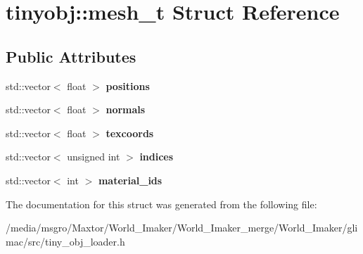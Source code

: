 \hypertarget{structtinyobj_1_1mesh__t}{}\section{tinyobj\+:\+:mesh\+\_\+t Struct Reference}
\label{structtinyobj_1_1mesh__t}
\subsection*{Public Attributes}
\begin{DoxyCompactItemize}
\item 
\mbox{\label{structtinyobj_1_1mesh__t_a3014a27913256384aa283345b69ff2ec}} 
std\+::vector$<$ float $>$ {\bfseries positions}
\item 
\mbox{\label{structtinyobj_1_1mesh__t_a28c2f7eb3114e6ed82a5b7326a4e7a1c}} 
std\+::vector$<$ float $>$ {\bfseries normals}
\item 
\mbox{\label{structtinyobj_1_1mesh__t_a0fc485afc76bcd7e147b22285d7d6575}} 
std\+::vector$<$ float $>$ {\bfseries texcoords}
\item 
\mbox{\label{structtinyobj_1_1mesh__t_aa0a07f40559a650e6917c506d78e298a}} 
std\+::vector$<$ unsigned int $>$ {\bfseries indices}
\item 
\mbox{\label{structtinyobj_1_1mesh__t_a57b2f12dfa3fd620b25babcd3a09ec6b}} 
std\+::vector$<$ int $>$ {\bfseries material\+\_\+ids}
\end{DoxyCompactItemize}


The documentation for this struct was generated from the following file\+:\begin{DoxyCompactItemize}
\item 
/media/msgro/\+Maxtor/\+World\+\_\+\+Imaker/\+World\+\_\+\+Imaker\+\_\+merge/\+World\+\_\+\+Imaker/glimac/src/tiny\+\_\+obj\+\_\+loader.\+h\end{DoxyCompactItemize}
